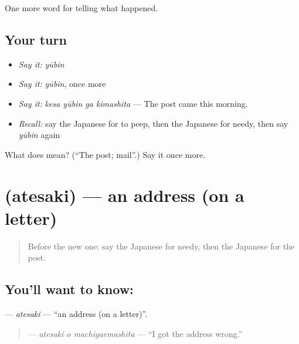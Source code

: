 \begin{grammarlens}[title={What you've built}]
One more word for telling what happened.
\end{grammarlens}

\subsection*{Your turn}
\begin{itemize}
\raggedright
  \item \emph{Say it:} \emph{yūbin}
  \item \emph{Say it:} \emph{yūbin}, once more
  \item \emph{Say it:} \emph{kesa yūbin ga kimashita} — The post came this morning.
  \item \emph{Recall:} say the Japanese for to peep, then the Japanese for needy, then say \emph{yūbin} again
\end{itemize}

\begin{tcolorbox}[breakable,colback=teal!4,colframe=teal!35!black,title={Before you move on}]
What does  mean? (\textquotedblleft{}The post; mail\textquotedblright{}.) Say it once more.
\end{tcolorbox}
\section[\texorpdfstring{\ja{あてさき} (atesaki)}{あてさき (atesaki)}]{ (atesaki) — an address (on a letter)}

\label{lesson:JA-C305-atesaki}



\begin{quote}
Before the new one: say the Japanese for needy, then the Japanese for the post.
\end{quote}

\subsection*{You'll want to know: }
\textbf{} — \emph{atesaki} — \textquotedblleft{}an address (on a letter)\textquotedblright{}.

\begin{quote}
\textbf{ } — \emph{atesaki o machigaemashita} — \textquotedblleft{}I got the address wrong.\textquotedblright{}
\end{quote}

